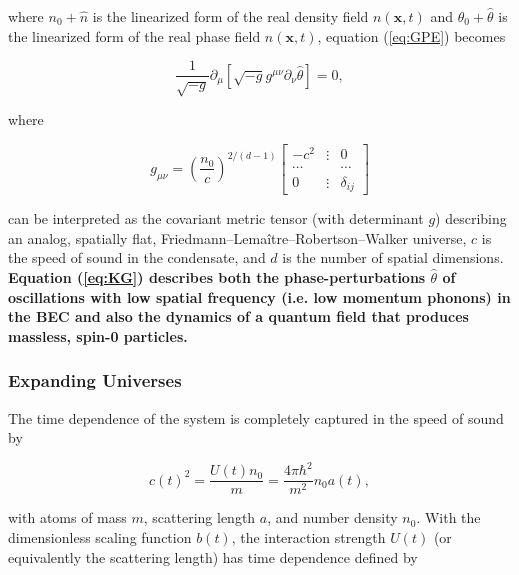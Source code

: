 \documentclass{article}
\begin{document}
                where $n_0 + \hat{n}$ is the linearized form of the real density field $n(\mathbf{x}, t)$ and $\theta_0 + \hat{\theta}$ is the linearized form of the real phase field $n(\mathbf{x}, t)$, equation (\ref{eq:GPE}) becomes\cite{Jain} 
    
                \begin{equation} \label{eq:KG}
                    \frac{1}{\sqrt{-g}} \partial_\mu \left[ \sqrt{-g} g^{\mu \nu} \partial_\nu \hat{\theta} \right] = 0,
                \end{equation}
    
                where 
    
                \begin{equation} \label{eq:metric}
                    g_{\mu \nu} = \left( \frac{n_0}{c} \right)^{2 / (d - 1)} \begin{bmatrix}
                        -c^2 & \vdots & 0 \\
                        \cdots & & \cdots \\
                        0 & \vdots & \delta_{ij}
                    \end{bmatrix}
                \end{equation}
    
                can be interpreted as the covariant metric tensor (with determinant $g$) describing an analog, spatially flat, Friedmann–Lema{\^i}tre–Robertson–Walker universe, $c$ is the speed of sound in the condensate, and $d$ is the number of spatial dimensions.  \textbf{Equation (\ref{eq:KG}) describes both the phase-perturbations $\hat{\theta}$ of oscillations with low spatial frequency (i.e. low momentum phonons) in the BEC and also the dynamics of a quantum field that produces massless, spin-0 particles.}

            \subsubsection{Expanding Universes}

                The time dependence of the system is completely captured in the speed of sound by 
    
                \begin{equation} \label{eq:speed}
                    c(t)^2 = \frac{U(t) n_0}{m} = \frac{4 \pi \hbar^2}{m^2} n_0 a(t),
                \end{equation}
    
                with atoms of mass $m$, scattering length $a$, and number density $n_0$.  With the dimensionless scaling function $b(t)$, the interaction strength $U(t)$ (or equivalently the scattering length) has time dependence defined by 
    
\end{document}
